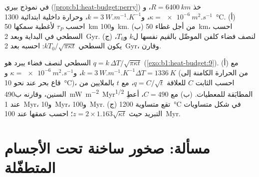 \begin{exercise}[$\star\star\star$]\label{exo:b1:heat-budget:11}
في نموذج بيري (\cref{prop:b1:heat-budget:perry}) خذ $R = \qty{6400}{km}$، و$\kappa = \qty{e-6}{m^2.s^{-1}}$، و$k = \qty{3}{W.m^{-1}.K^{-1}}$، وحرارة داخلية ابتدائية \qty{1300}{\degreeCelsius}. (أ) احسب $\tau_P$ لأغطية سمكها \qty{50}{km} و\qty{100}{km}. (ب) من أجل غطاء \qty{50}{km}، احسب  السطحي في البداية وبعد \qty{2}{Gyr}. (ج) لنصف فضاء كلفن الموصِّل بالقيم نفسها ل$k$ و$T_0$، يكون  السطحي $kT_0/\sqrt{\pi\kappa t}$: احسبه بعد \qty{2}{Gyr}، وقارن.
\end{exercise}

\begin{exercise}[$\star\star\star$]\label{exo:b1:heat-budget:12}
 السطحي لنصف فضاء يبرد هو $q = k\,\Delta T/\sqrt{\pi\kappa t}$ (\cref{exo:b1:heat-budget:9}). (أ) مع $k = \qty{3}{W.m^{-1}.K^{-1}}$، و$\kappa =
\qty{e-6}{m^2.s^{-1}}$ و$\Delta T = \qty{1336}{K}$ (من الحرارة الكامنة إلى قاع بحر عند نحو \qty{10}{\degreeCelsius})، احسب الثابت $C$ للعلاقة $q = C/\sqrt t$، مع $t$ بالملايين من السنين، وقارنه ب\qty{490}{mW.m^{-2}.Myr^{1/2}} المطابَقة للمعطيات. (ب) مع $C = 490$، أعطِ  عند \qty{1}{Myr}، و\qty{10}{Myr}، و\qty{100}{Myr}. (ج) تقع متساوية \qty{1200}{\degreeCelsius} في شكل متساويات التبريد حيث $z = 2\times1.163\sqrt{\kappa t}$؛ احسب عمقها عند \qty{100}{Myr}.
\end{exercise}

\section{مسألة: صخور ساخنة تحت الأجسام المتطفّلة}

